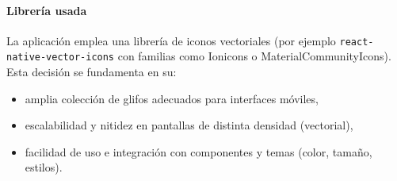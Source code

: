 \documentclass[twoside, openright, 11pt]{report}
\begin{document}
				\paragraph{Librería usada}
					La aplicación emplea una librería de iconos vectoriales (por ejemplo \texttt{react-native-vector-icons} con familias como Ionicons o MaterialCommunityIcons). Esta decisión se fundamenta en su:
					\begin{itemize}
						\item amplia colección de glifos adecuados para interfaces móviles,
						\item escalabilidad y nitidez en pantallas de distinta densidad (vectorial),
						\item facilidad de uso e integración con componentes y temas (color, tamaño, estilos).
					\end{itemize}
				
\end{document}
